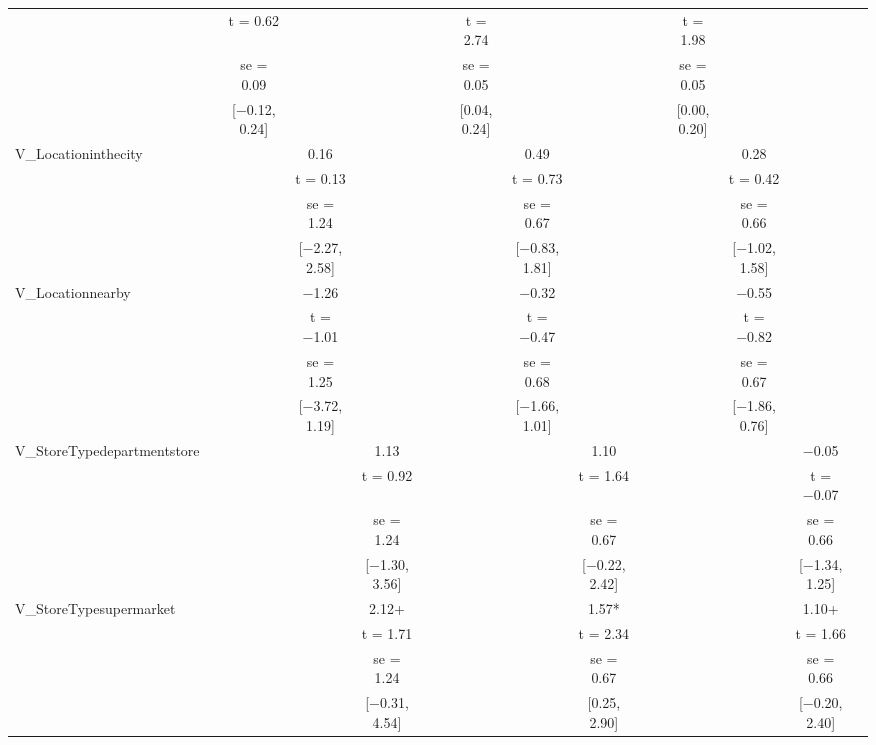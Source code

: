 \documentclass[]{report}
\begin{document}
\begin{table}
{\begin{tabular}[t]{lccccccccccccccc}
		&  & t = \num{0.62} &  &  &  &  & t = \num{2.74} &  &  &  &  & t = \num{1.98} &  &  & \\
		&  & se = \num{0.09} &  &  &  &  & se = \num{0.05} &  &  &  &  & se = \num{0.05} &  &  & \\
		&  & {}[\num{-0.12}, \num{0.24}] &  &  &  &  & {}[\num{0.04}, \num{0.24}] &  &  &  &  & {}[\num{0.00}, \num{0.20}] &  &  & \\
		V\_Locationinthecity &  &  & \num{0.16} &  &  &  &  & \num{0.49} &  &  &  &  & \num{0.28} &  & \\
		&  &  & t = \num{0.13} &  &  &  &  & t = \num{0.73} &  &  &  &  & t = \num{0.42} &  & \\
		&  &  & se = \num{1.24} &  &  &  &  & se = \num{0.67} &  &  &  &  & se = \num{0.66} &  & \\
		&  &  & {}[\num{-2.27}, \num{2.58}] &  &  &  &  & {}[\num{-0.83}, \num{1.81}] &  &  &  &  & {}[\num{-1.02}, \num{1.58}] &  & \\
		V\_Locationnearby &  &  & \num{-1.26} &  &  &  &  & \num{-0.32} &  &  &  &  & \num{-0.55} &  & \\
		&  &  & t = \num{-1.01} &  &  &  &  & t = \num{-0.47} &  &  &  &  & t = \num{-0.82} &  & \\
		&  &  & se = \num{1.25} &  &  &  &  & se = \num{0.68} &  &  &  &  & se = \num{0.67} &  & \\
		&  &  & {}[\num{-3.72}, \num{1.19}] &  &  &  &  & {}[\num{-1.66}, \num{1.01}] &  &  &  &  & {}[\num{-1.86}, \num{0.76}] &  & \\
		V\_StoreTypedepartmentstore &  &  &  & \num{1.13} &  &  &  &  & \num{1.10} &  &  &  &  & \num{-0.05} & \\
		&  &  &  & t = \num{0.92} &  &  &  &  & t = \num{1.64} &  &  &  &  & t = \num{-0.07} & \\
		&  &  &  & se = \num{1.24} &  &  &  &  & se = \num{0.67} &  &  &  &  & se = \num{0.66} \vphantom{1} & \\
		&  &  &  & {}[\num{-1.30}, \num{3.56}] &  &  &  &  & {}[\num{-0.22}, \num{2.42}] &  &  &  &  & {}[\num{-1.34}, \num{1.25}] & \\
		V\_StoreTypesupermarket &  &  &  & \num{2.12}+ &  &  &  &  & \num{1.57}* &  &  &  &  & \num{1.10}+ & \\
		&  &  &  & t = \num{1.71} &  &  &  &  & t = \num{2.34} &  &  &  &  & t = \num{1.66} & \\
		&  &  &  & se = \num{1.24} &  &  &  &  & se = \num{0.67} &  &  &  &  & se = \num{0.66} & \\
		&  &  &  & {}[\num{-0.31}, \num{4.54}] &  &  &  &  & {}[\num{0.25}, \num{2.90}] &  &  &  &  & {}[\num{-0.20}, \num{2.40}] & \\

\end{tabular}}
\end{table}
\end{document}
